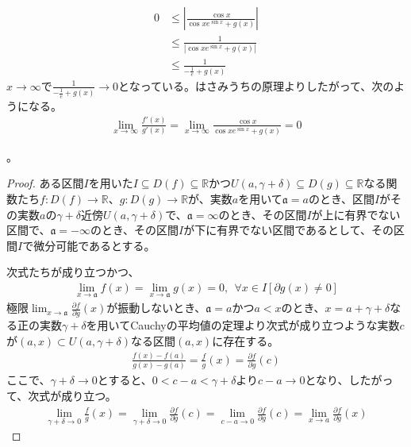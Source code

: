 \documentclass[dvipdfmx]{jsarticle}
\begin{document}
\begin{thm}[l'Hôpitalの定理]
{\begin{itemize}
\begin{align*}
0&\leq \left| \frac{\cos x}{\cos x e^{\sin x} +g(x)} \right| \\
&\leq \frac{1}{\left| \cos xe^{\sin x} +g(x)\right| } \\
&\leq \frac{1}{-\frac{1}{e} +g(x)}
\end{align*}
$x\rightarrow \infty $で$\frac{1}{-\frac{1}{e} +g(x)} \rightarrow 0$となっている。はさみうちの原理よりしたがって、次のようになる。
\begin{align*}
\lim_{x\rightarrow \infty }{\frac{f'(x)}{g'(x)}} =\lim_{x\rightarrow \infty }{\frac{\cos x}{\cos x e^{\sin x} +g(x)} }=0
\end{align*}
\end{itemize}
}。
\end{thm}
\begin{proof}
ある区間$I$を用いた$I \subseteq D(f) \subseteq \mathbb{R}$かつ$U\left( a,\gamma + \delta \right) \subseteq D(g) \subseteq \mathbb{R}$なる関数たち$f:D(f) \rightarrow \mathbb{R}$、$g:D(g) \rightarrow \mathbb{R}$が、実数$a$を用いて$\mathfrak{a} =a$のとき、区間$I$がその実数$a$の$\gamma + \delta$近傍$U\left( a,\gamma + \delta \right)$で、$\mathfrak{a = \infty}$のとき、その区間$I$が上に有界でない区間で、$\mathfrak{a = - \infty}$のとき、その区間$I$が下に有界でない区間であるとして、その区間$I$で微分可能であるとする。\par
次式たちが成り立つかつ、
\begin{align*}
\lim_{x \rightarrow \mathfrak{a}}{f(x)} = \lim_{x \rightarrow \mathfrak{a}}{g(x)} = 0,\ \ \forall x \in I\left[ \partial g(x) \neq 0 \right]
\end{align*}
極限$\lim_{x \rightarrow \mathfrak{a}}{\frac{\partial f}{\partial g}(x)}$が振動しないとき、$\mathfrak{a} =a$かつ$a < x$のとき、$x = a + \gamma + \delta$なる正の実数$\gamma + \delta$を用いてCauchyの平均値の定理より次式が成り立つような実数$c$が$(a,x) \subset U\left( a,\gamma + \delta \right)$なる区間$(a,x)$に存在する。
\begin{align*}
\frac{f(x) - f(a)}{g(x) - g(a)} = \frac{f}{g}(x) = \frac{\partial f}{\partial g}(c)
\end{align*}
ここで、$\gamma + \delta \rightarrow 0$とすると、$0 < c - a < \gamma + \delta$より$c - a \rightarrow 0$となり、したがって、次式が成り立つ。
\begin{align*}
\lim_{\gamma + \delta \rightarrow 0}{\frac{f}{g}(x)} = \lim_{\gamma + \delta \rightarrow 0}{\frac{\partial f}{\partial g}(c)} = \lim_{c - a \rightarrow 0}{\frac{\partial f}{\partial g}(c)} = \lim_{x \rightarrow a}{\frac{\partial f}{\partial g}(x)}

\end{align*}
\end{proof}
\end{document}
